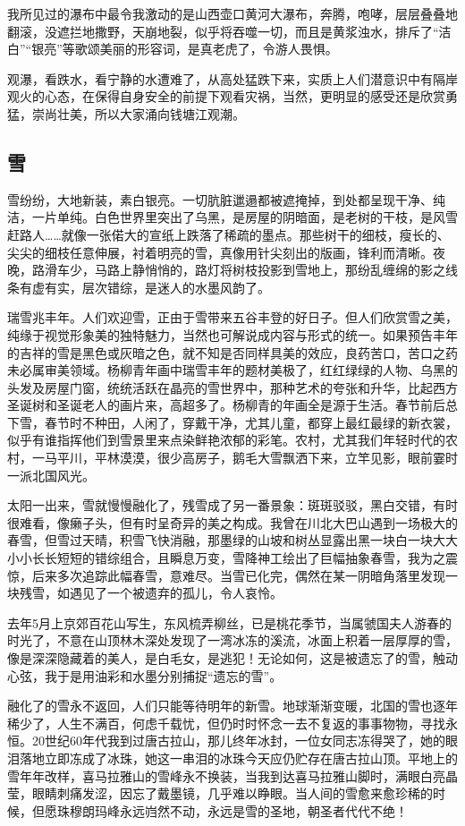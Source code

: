 \documentclass{article}
\begin{document}
我所见过的瀑布中最令我激动的是山西壶口黄河大瀑布，奔腾，咆哮，层层叠叠地翻滚，没遮拦地撒野，天崩地裂，似乎将吞噬一切，而且是黄浆浊水，排斥了“洁白”“银亮”等歌颂美丽的形容词，是真老虎了，令游人畏惧。

观瀑，看跌水，看宁静的水遭难了，从高处猛跌下来，实质上人们潜意识中有隔岸观火的心态，在保得自身安全的前提下观看灾祸，当然，更明显的感受还是欣赏勇猛，崇尚壮美，所以大家涌向钱塘江观潮。
\subsection{雪}
雪纷纷，大地新装，素白银亮。一切肮脏邋遢都被遮掩掉，到处都呈现干净、纯洁，一片单纯。白色世界里突出了乌黑，是房屋的阴暗面，是老树的干枝，是风雪赶路人……就像一张偌大的宣纸上跌落了稀疏的墨点。那些树干的细枝，瘦长的、尖尖的细枝任意伸展，衬着明亮的雪，真像用针尖刻出的版画，锋利而清晰。夜晚，路滑车少，马路上静悄悄的，路灯将树枝投影到雪地上，那纷乱缠绵的影之线条有虚有实，层次错综，是迷人的水墨风韵了。

瑞雪兆丰年。人们欢迎雪，正由于雪带来五谷丰登的好日子。但人们欣赏雪之美，纯缘于视觉形象美的独特魅力，当然也可解说成内容与形式的统一。如果预告丰年的吉祥的雪是黑色或灰暗之色，就不知是否同样具美的效应，良药苦口，苦口之药未必属审美领域。杨柳青年画中瑞雪丰年的题材美极了，红红绿绿的人物、乌黑的头发及房屋门窗，统统活跃在晶亮的雪世界中，那种艺术的夸张和升华，比起西方圣诞树和圣诞老人的画片来，高超多了。杨柳青的年画全是源于生活。春节前后总下雪，春节时不种田，人闲了，穿戴干净，尤其儿童，都穿上最红最绿的新衣裳，似乎有谁指挥他们到雪景里来点染鲜艳浓郁的彩笔。农村，尤其我们年轻时代的农村，一马平川，平林漠漠，很少高房子，鹅毛大雪飘洒下来，立竿见影，眼前霎时一派北国风光。

太阳一出来，雪就慢慢融化了，残雪成了另一番景象：斑斑驳驳，黑白交错，有时很难看，像癞子头，但有时呈奇异的美之构成。我曾在川北大巴山遇到一场极大的春雪，但雪过天晴，积雪飞快消融，那墨绿的山坡和树丛显露出黑一块白一块大大小小长长短短的错综组合，且瞬息万变，雪降神工绘出了巨幅抽象春雪，我为之震惊，后来多次追踪此幅春雪，意难尽。当雪已化完，偶然在某一阴暗角落里发现一块残雪，如遇见了一个被遗弃的孤儿，令人哀怜。

去年5月上京郊百花山写生，东风梳弄柳丝，已是桃花季节，当属虢国夫人游春的时光了，不意在山顶林木深处发现了一湾冰冻的溪流，冰面上积着一层厚厚的雪，像是深深隐藏着的美人，是白毛女，是逃犯！无论如何，这是被遗忘了的雪，触动心弦，我于是用油彩和水墨分别捕捉“遗忘的雪”。

融化了的雪永不返回，人们只能等待明年的新雪。地球渐渐变暖，北国的雪也逐年稀少了，人生不满百，何虑千载忧，但仍时时怀念一去不复返的事事物物，寻找永恒。20世纪60年代我到过唐古拉山，那儿终年冰封，一位女同志冻得哭了，她的眼泪落地立即冻成了冰珠，她这一串泪的冰珠今天应仍贮存在唐古拉山顶。平地上的雪年年改样，喜马拉雅山的雪峰永不换装，当我到达喜马拉雅山脚时，满眼白亮晶莹，眼睛刺痛发涩，因忘了戴墨镜，几乎难以睁眼。当人间的雪愈来愈珍稀的时候，但愿珠穆朗玛峰永远岿然不动，永远是雪的圣地，朝圣者代代不绝！
\end{document}
